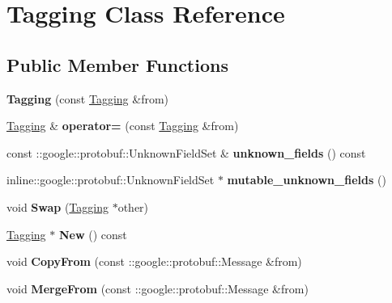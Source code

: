 \hypertarget{classTagging}{
\section{Tagging Class Reference}
\label{classTagging}
}
\subsection*{Public Member Functions}
\begin{DoxyCompactItemize}
\item 
\hypertarget{classTagging_a3236d0c0080d7f797f080151e66b756e}{
{\bfseries Tagging} (const \hyperlink{classTagging}{Tagging} \&from)}
\label{classTagging_a3236d0c0080d7f797f080151e66b756e}

\item 
\hypertarget{classTagging_ab21cdd0216e66fb17a8319c5f4b1a4d6}{
\hyperlink{classTagging}{Tagging} \& {\bfseries operator=} (const \hyperlink{classTagging}{Tagging} \&from)}
\label{classTagging_ab21cdd0216e66fb17a8319c5f4b1a4d6}

\item 
\hypertarget{classTagging_a1d1cc0a22c9a9f084b64f5fb6545390b}{
const ::google::protobuf::UnknownFieldSet \& {\bfseries unknown\_\-fields} () const }
\label{classTagging_a1d1cc0a22c9a9f084b64f5fb6545390b}

\item 
\hypertarget{classTagging_a91d117de804c4646ab9ea9d3103d40d9}{
inline::google::protobuf::UnknownFieldSet $\ast$ {\bfseries mutable\_\-unknown\_\-fields} ()}
\label{classTagging_a91d117de804c4646ab9ea9d3103d40d9}

\item 
\hypertarget{classTagging_a6b6767148366f94de9462d02171d19d0}{
void {\bfseries Swap} (\hyperlink{classTagging}{Tagging} $\ast$other)}
\label{classTagging_a6b6767148366f94de9462d02171d19d0}

\item 
\hypertarget{classTagging_ad46be5a72376294a63988a2662dc74b3}{
\hyperlink{classTagging}{Tagging} $\ast$ {\bfseries New} () const }
\label{classTagging_ad46be5a72376294a63988a2662dc74b3}

\item 
\hypertarget{classTagging_a337681fda513929c00d203798c04ad52}{
void {\bfseries CopyFrom} (const ::google::protobuf::Message \&from)}
\label{classTagging_a337681fda513929c00d203798c04ad52}

\item 
\hypertarget{classTagging_acaf751b83c2458013c2d12c4bdaea619}{
void {\bfseries MergeFrom} (const ::google::protobuf::Message \&from)}
\label{classTagging_acaf751b83c2458013c2d12c4bdaea619}


\end{DoxyCompactItemize}
